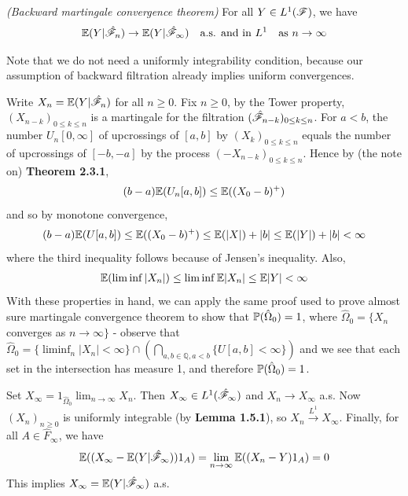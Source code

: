 \documentclass[12pt,a4paper]{report}
\newenvironment{proof}
{\begin{changemargin}{1cm}{0.5cm} 
	}%
	{\end{changemargin}
}
\begin{document}
 \emph{(Backward martingale convergence theorem)} For all $Y\in L^1(\mathscr{F})$, we have 
\begin{align*}
\mathbb{E}(Y|\hat{\mathscr{F}}_n) \rightarrow \mathbb{E}(Y|\hat{\mathscr{F}}_{\infty}) \quad \text{a.s. and in } L^1 \quad \text{as } n\rightarrow \infty
\end{align*}
\s

Note that we do not need a uniformly integrability condition, because our assumption of backward filtration already implies uniform convergences.
\begin{proof}
\pf Write $X_n = \mathbb{E}(Y|\hat{\mathscr{F}}_n)$ for all $n\geq 0$. Fix $n\geq 0$, by the Tower property, $(X_{n-k})_{0\leq k\leq n}$ is a martingale for the filtration $(\hat{\mathscr{F}}_{n-k})_{0\leq k\leq n}$. For $a<b$, the number $U_n[0,\infty]$ of upcrossings of $[a,b]$ by $(X_k)_{0\leq k \leq n}$ equals the number of upcrossings of $[-b,-a]$ by the process $(-X_{n-k})_{0\leq k\leq n}$. Hence by (the note on) \textbf{Theorem 2.3.1},
\begin{align*}
(b-a)\mathbb{E}(U_n [a,b]) \leq \mathbb{E}((X_0 -b)^+)
\end{align*}
and so by monotone convergence,
\begin{align*}
(b-a) \mathbb{E}(U[a,b]) \leq \mathbb{E}((X_0-b)^+) \leq \mathbb{E}(|X|) + |b| \leq \mathbb{E}(|Y|) + |b| <\infty
\end{align*}
where the third inequality follows because of Jensen's inequality. Also, 
\begin{align*}
\mathbb{E}(\liminf |X_n|) \leq \liminf \mathbb{E}|X_n| \leq \mathbb{E}|Y| < \infty
\end{align*}
With these properties in hand, we can apply the same proof used to prove almost sure martingale convergence theorem to show that $\mathbb{P}(\hat{\Omega}_0)=1$, where $\hat{\Omega}_0 = \{X_n$ converges as $n\rightarrow \infty \}$ - observe that $\hat{\Omega}_0 = \{\liminf_n |X_n| < \infty\} \cap (\bigcap_{a,b\in \mathbb{Q},a<b} \{ U[a,b]<\infty  \} )$ and we see that each set in the intersection has measure 1, and therefore $\mathbb{P}(\hat{\Omega}_0)=1$.

\quad Set $X_{\infty} = 1_{\hat{\Omega}_0} \lim_{n\rightarrow \infty} X_n$. Then $X_{\infty} \in L^1(\hat{\mathscr{F}}_{\infty})$ and $X_n \rightarrow X_{\infty}$ a.s. Now $(X_n)_{n\geq 0}$ is uniformly integrable (by \textbf{Lemma 1.5.1}), so $X_n\xrightarrow{L^1} X_{\infty}$. Finally, for all $A\in \hat{F}_{\infty}$, we have
\begin{align*}
\mathbb{E}((X_{\infty} - \mathbb{E}(Y|\hat{\mathscr{F}}_{\infty})) 1_A) = \lim_{n\rightarrow \infty} \mathbb{E}((X_n -Y)1_A) = 0
\end{align*}
This implies $X_{\infty} = \mathbb{E}(Y|\hat{\mathscr{F}}_{\infty})$ a.s.

\eop
\end{proof}
\end{document}
